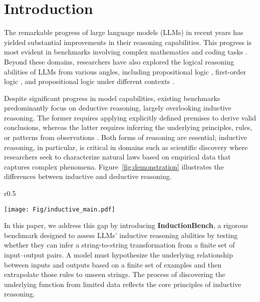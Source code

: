 \section{Introduction}
The remarkable progress of large language models (LLMs) in recent years has yielded substantial improvements in their reasoning capabilities. This progress is most evident in benchmarks involving complex mathematics \citep{cobbe2021training, hendrycks2021measuring} and coding tasks \citep{jain2024livecodebench, jimenez2023swe, chen2021evaluating, fan2023nphardeval}. Beyond these domains, researchers have also explored the logical reasoning abilities of LLMs from various angles, including propositional logic \citep{zhu2023dyval}, first-order logic \citep{han2022folio, parmar2024logicbench}, and propositional logic under different contexts \citep{hua2024disentangling}.





Despite significant progress in model capabilities, existing benchmarks predominantly focus on deductive reasoning, largely overlooking inductive reasoning. The former requires applying explicitly defined premises to derive valid conclusions, whereas the latter requires inferring the underlying principles, rules, or patterns from observations \citep{hawthorne2004inductive}. Both forms of reasoning are essential; inductive reasoning, in particular, is critical in domains such as scientific discovery where researchers seek to characterize natural laws based on empirical data \citep{grunwald2007minimum, hansen2001model} that captures complex phenomena. Figure~\ref{fig:demonstration} illustrates the differences between inductive and deductive reasoning.

\begin{wrapfigure}{r}{0.5\textwidth}
  \begin{center}
    \texttt{[image: Fig/inductive\_main.pdf]}
    \vspace{-10pt}
    \caption{Deductive vs. Inductive Reasoning}
    \label{fig:demonstration}
  \end{center}
\end{wrapfigure}

In this paper, we address this gap by introducing \textbf{InductionBench}, a rigorous benchmark designed to assess LLMs' inductive reasoning abilities by testing whether they can infer a string-to-string transformation from a finite set of input–output pairs. A model must hypothesize the underlying relationship between inputs and outputs based on a finite set of examples and then extrapolate those rules to unseen strings. The process of discovering the underlying function from limited data reflects the core principles of inductive reasoning.

